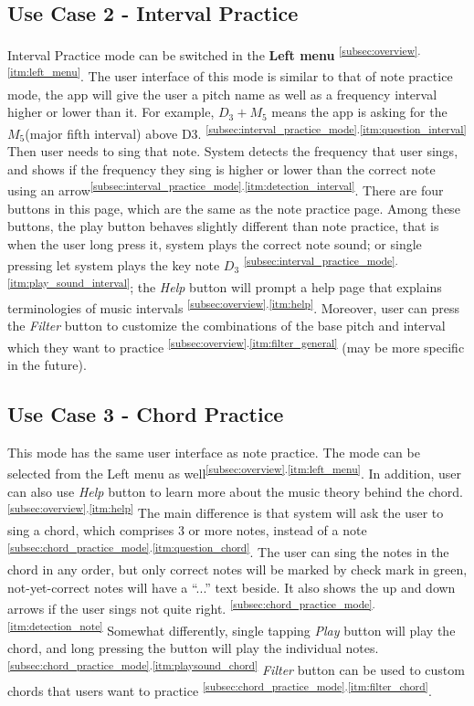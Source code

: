 \documentclass{article}
\begin{document}
\subsection{Use Case 2 - Interval Practice}
\qquad
    Interval Practice mode can be switched in the \textbf{Left menu} \textsuperscript{\ref{subsec:overview}.\ref{itm:left_menu}}. 
    The user interface of this mode is similar to that of note practice mode, the app will give the user a pitch name as well as a frequency interval higher or lower than it. 
    For example, $D_3 + M_5$ means the app is asking for the $M_5$(major fifth interval) above D3. \textsuperscript{\ref{subsec:interval_practice_mode}.\ref{itm:question_interval}} 
    Then user needs to sing that note. 
    System detects the frequency that user sings, and shows if the frequency they sing is higher or lower than the correct note using an arrow\textsuperscript{\ref{subsec:interval_practice_mode}.\ref{itm:detection_interval}}. 
    There are four buttons in this page, which are the same as the note practice page. 
    Among these buttons, the play button behaves slightly different than note practice, that is when the user long press it, system plays the correct note sound; or single pressing let system plays the key note $D_3$ \textsuperscript{\ref{subsec:interval_practice_mode}.\ref{itm:play_sound_interval}}; the \textit{Help} button will prompt a help page that explains terminologies of music intervals \textsuperscript{\ref{subsec:overview}.\ref{itm:help}}. 
    Moreover, user can press the \textit{Filter} button to customize the combinations of the base pitch and interval which they want to practice \textsuperscript{\ref{subsec:overview}.\ref{itm:filter_general}} (may be more specific in the future). 


\subsection{Use Case 3 - Chord Practice}
\qquad
    This mode has the same user interface as note practice. 
    The mode can be selected from the Left menu as well\textsuperscript{\ref{subsec:overview}.\ref{itm:left_menu}}. 
    In addition, user can also use \textit{Help} button to learn more about the music theory behind the chord. \textsuperscript{\ref{subsec:overview}.\ref{itm:help}} 
    The main difference is that system will ask the user to sing a chord, which comprises 3 or more notes, instead of a note \textsuperscript{\ref{subsec:chord_practice_mode}.\ref{itm:question_chord}}. 
    The user can sing the notes in the chord in any order, but only correct notes will be marked by check mark in green, not-yet-correct notes will have a “...” text beside. It also shows the up and down arrows if the user sings not quite right. \textsuperscript{\ref{subsec:chord_practice_mode}.\ref{itm:detection_note}}
    Somewhat differently, single tapping \textit{Play} button will play the chord, and long pressing the button will play the individual notes. \textsuperscript{\ref{subsec:chord_practice_mode}.\ref{itm:playsound_chord}}
    \textit{Filter} button can be used to custom chords that users want to practice \textsuperscript{\ref{subsec:chord_practice_mode}.\ref{itm:filter_chord}}.
\end{document}
